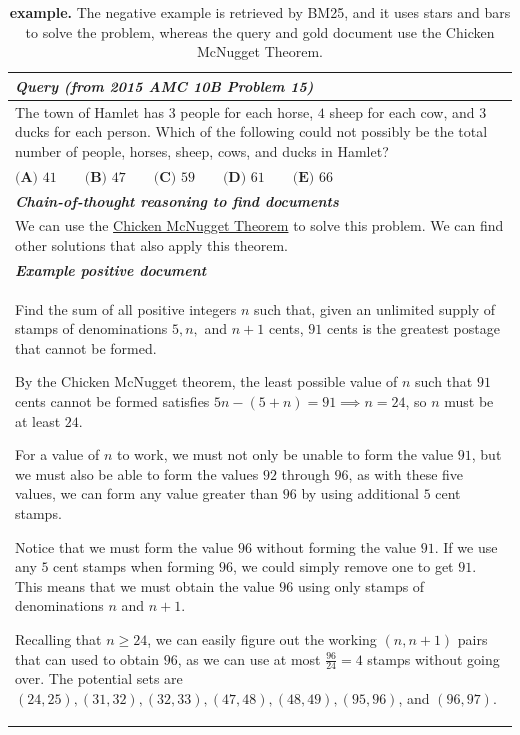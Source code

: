 \begin{table}[ht]
\caption{\textbf{\aops example.} The negative example is retrieved by BM25, and it uses stars and bars to solve the problem, whereas the query and gold document use the Chicken McNugget Theorem.}
\centering
\begin{tabular}{p{13cm}}
\toprule
\textit{\textbf{Query} (from 2015 AMC 10B Problem 15)} \\
\midrule
The town of Hamlet has $3$ people for each horse, $4$ sheep for each cow, and $3$ ducks for each person. Which of the following could not possibly be the total number of people, horses, sheep, cows, and ducks in Hamlet? \\
$\textbf{(A) }41\qquad\textbf{(B) }47\qquad\textbf{(C) }59\qquad\textbf{(D) }61\qquad\textbf{(E) }66$ \\
\midrule
\textit{\textbf{Chain-of-thought reasoning to find documents}} \\
\midrule
We can use the \href{https://artofproblemsolving.com/wiki/index.php/Chicken_McNugget_Theorem}{Chicken McNugget Theorem} to solve this problem. We can find other solutions that also apply this theorem.\\
\midrule
\textit{\textbf{Example positive document}} \\
\midrule
Find the sum of all positive integers $n$ such that, given an unlimited supply of stamps of denominations $5,n,$ and $n+1$ cents, $91$ cents is the greatest postage that cannot be formed.

By the Chicken McNugget theorem, the least possible value of $n$ such that $91$ cents cannot be formed satisfies $5n - (5 + n) = 91 \implies n = 24$, so $n$ must be at least $24$.

For a value of $n$ to work, we must not only be unable to form the value $91$, but we must also be able to form the values $92$ through $96$, as with these five values, we can form any value greater than $96$ by using additional $5$ cent stamps.

Notice that we must form the value $96$ without forming the value $91$. If we use any $5$ cent stamps when forming $96$, we could simply remove one to get $91$. This means that we must obtain the value $96$ using only stamps of denominations $n$ and $n+1$.

Recalling that $n \geq 24$, we can easily figure out the working $(n,n+1)$ pairs that can used to obtain $96$, as we can use at most $\frac{96}{24}=4$ stamps without going over. The potential sets are $(24, 25), (31, 32), (32, 33), (47, 48), (48, 49), (95, 96)$, and $(96, 97)$.


\end{tabular}
\end{table}
